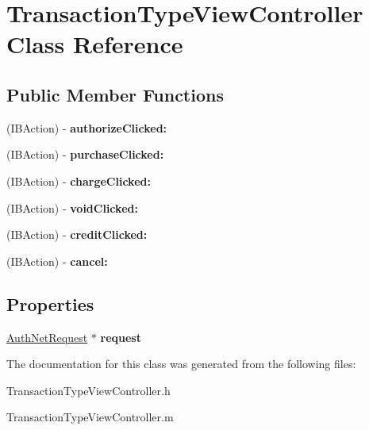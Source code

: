 \hypertarget{interface_transaction_type_view_controller}{
\section{TransactionTypeViewController Class Reference}
\label{interface_transaction_type_view_controller}
}
\subsection*{Public Member Functions}
\begin{DoxyCompactItemize}
\item 
\hypertarget{interface_transaction_type_view_controller_a5d2032c3466ac9a1c553f701bd9bde19}{
(IBAction) -\/ {\bfseries authorizeClicked:}}
\label{interface_transaction_type_view_controller_a5d2032c3466ac9a1c553f701bd9bde19}

\item 
\hypertarget{interface_transaction_type_view_controller_a36ee644d7a5226c8a6da48a52ca94bf4}{
(IBAction) -\/ {\bfseries purchaseClicked:}}
\label{interface_transaction_type_view_controller_a36ee644d7a5226c8a6da48a52ca94bf4}

\item 
\hypertarget{interface_transaction_type_view_controller_a11dbbb89314e0cf9d4dce73c60b986d6}{
(IBAction) -\/ {\bfseries chargeClicked:}}
\label{interface_transaction_type_view_controller_a11dbbb89314e0cf9d4dce73c60b986d6}

\item 
\hypertarget{interface_transaction_type_view_controller_ae506f4410cd95a659febb127ed8f785a}{
(IBAction) -\/ {\bfseries voidClicked:}}
\label{interface_transaction_type_view_controller_ae506f4410cd95a659febb127ed8f785a}

\item 
\hypertarget{interface_transaction_type_view_controller_ae740ea942389b066eb2b2c5b386433a6}{
(IBAction) -\/ {\bfseries creditClicked:}}
\label{interface_transaction_type_view_controller_ae740ea942389b066eb2b2c5b386433a6}

\item 
\hypertarget{interface_transaction_type_view_controller_a7bb1f231028467bd0c0f37495753b706}{
(IBAction) -\/ {\bfseries cancel:}}
\label{interface_transaction_type_view_controller_a7bb1f231028467bd0c0f37495753b706}

\end{DoxyCompactItemize}
\subsection*{Properties}
\begin{DoxyCompactItemize}
\item 
\hypertarget{interface_transaction_type_view_controller_a746e50532337c90d4f9a340a08a55015}{
\hyperlink{interface_auth_net_request}{AuthNetRequest} $\ast$ {\bfseries request}}
\label{interface_transaction_type_view_controller_a746e50532337c90d4f9a340a08a55015}

\end{DoxyCompactItemize}


The documentation for this class was generated from the following files:\begin{DoxyCompactItemize}
\item 
TransactionTypeViewController.h\item 
TransactionTypeViewController.m\end{DoxyCompactItemize}
